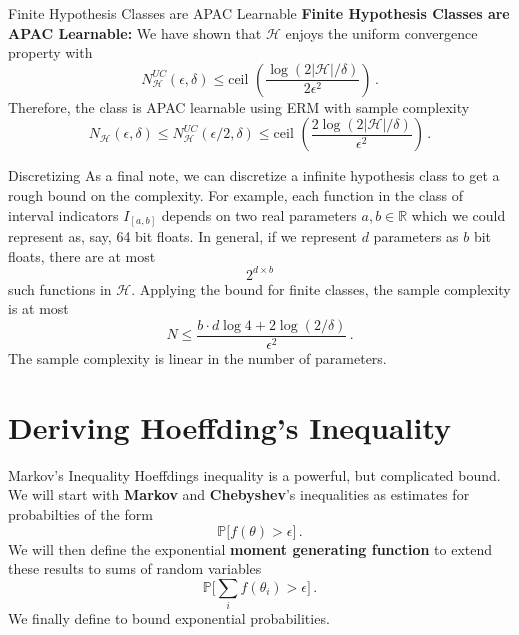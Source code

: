 \documentclass[10pt, table, handout]{beamer}
\newcommand{\cH}{\ensuremath{\mathcal{H}}}
\newcommand{\bR}{\ensuremath{\mathbb{R}}}
\newcommand{\bP}{\ensuremath{\mathbb{P}}}
\begin{document}
\begin{frame}[fragile]{Finite Hypothesis Classes are APAC Learnable}
\textbf{Finite Hypothesis Classes are APAC Learnable:}
We have shown that $\mathcal{H}$ enjoys the uniform convergence property with
$$
N_{\cH}^{UC}(\epsilon,\delta)\leq \text{ceil }\left(\frac{\log(2|\cH|/\delta)}{2\epsilon^2}\right)\,.
$$\pause
Therefore, the class is APAC learnable using ERM with sample complexity 
$$
N_{\cH}(\epsilon,\delta)\leq N_{\cH}^{UC}(\epsilon/2,\delta) \leq \text{ceil }\left(\frac{2\log(2|\cH|/\delta)}{\epsilon^2}\right)\,.
$$
\end{frame}



\begin{frame}[fragile]{Discretizing}
As a final note, we can discretize a infinite hypothesis class to get a rough bound on the complexity. \pause For example, each function in the class of interval indicators $I_{[a,b]}$ depends on two real parameters $a,b\in \bR$ which we could represent as, say, 64 bit floats. In general, if we represent $d$ parameters as $b$ bit floats, there are at most
$$
2^{d\times b}
$$
such functions in $\cH$. \pause Applying the bound for finite classes, the sample complexity is at most
$$
N\leq \frac{b\cdot d \log 4+2\log(2/\delta)}{\epsilon^2}\,.
$$
The sample complexity is linear in the number of parameters. 

\end{frame}




\section{Deriving Hoeffding's Inequality}


\begin{frame}[fragile]{Markov’s Inequality}
Hoeffdings inequality is a powerful, but complicated bound. We will start with \textbf{Markov} and \textbf{Chebyshev}'s inequalities as estimates for probabilties of the form
$$
\bP\big[ f(\theta)>\epsilon \big]\,.
$$\pause
We will then define the exponential \textbf{moment generating function} to extend these results to sums of random variables
$$
\bP\big[ \sum_i f(\theta_i)>\epsilon \big]\,.
$$\pause
We finally define  to bound exponential probabilities.

\end{frame}
\end{document}
